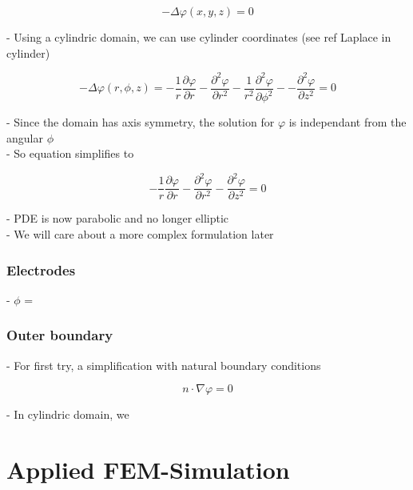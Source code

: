\documentclass[parskip=half, titlepage=yes, 12pt, BCOR=12mm, DIV=calc]{scrartcl}
\begin{document}
\begin{equation}
    - \Delta \varphi(x,y,z) = 0
\end{equation}

- Using a cylindric domain, we can use cylinder coordinates (see ref Laplace in cylinder)

\begin{equation}
    - \Delta \varphi(r,\phi,z) = - \frac{1}{r} \frac{\partial \varphi}{\partial r} - \frac{\partial^2 \varphi}{\partial r^2} - \frac{1}{r^2} \frac{\partial^2 \varphi}{\partial \phi^2} - - \frac{\partial^2 \varphi}{\partial z^2}  = 0
\end{equation}

- Since the domain has axis symmetry, the solution for $\varphi$ is independant from the angular $\phi$ \\
- So equation simplifies to

\begin{equation}
    - \frac{1}{r} \frac{\partial \varphi}{\partial r} - \frac{\partial^2 \varphi}{\partial r^2} - \frac{\partial^2 \varphi}{\partial z^2} = 0
\end{equation}

- PDE is now parabolic and no longer elliptic \\
- We will care about a more complex formulation later 

\subsubsection{Electrodes}

- $\phi$ = 

\subsubsection{Outer boundary}

- For first try, a simplification with natural boundary conditions

\begin{equation}
    n \cdot \nabla \varphi = 0
\end{equation}

- In cylindric domain, we 
\begin{equation}
    
\end{equation}



\section{Applied FEM-Simulation}
\end{document}
